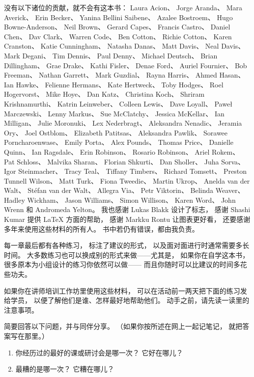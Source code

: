 没有以下诸位的贡献，就不会有这本书：
Laura Acion、
Jorge Aranda、
Mara Averick、
Erin Becker、
Yanina Bellini Saibene、
Azalee Bostroem、
Hugo Bowne-Anderson、
Neil Brown、
Gerard Capes、
Francis Castro、
Daniel Chen、
Dav Clark、
Warren Code、
Ben Cotton、
Richie Cotton、
Karen Cranston、
Katie Cunningham、
Natasha Danas、
Matt Davis、
Neal Davis、
Mark Degani、
Tim Dennis、
Paul Denny、
Michael Deutsch、
Brian Dillingham、
Grae Drake、
Kathi Fisler、
Denae Ford、
Auriel Fournier、
Bob Freeman、
Nathan Garrett、
Mark Guzdial、
Rayna Harris、
Ahmed Hasan、
Ian Hawke、
Felienne Hermans、
Kate Hertweck、
Toby Hodges、
Roel Hogervorst、
Mike Hoye、
Dan Katz、
Christina Koch、
Shriram Krishnamurthi、
Katrin Leinweber、
Colleen Lewis、
Dave Loyall、
Paweł Marczewski、
Lenny Markus、
Sue McClatchy、
Jessica McKellar、
Ian Milligan、
Julie Moronuki、
Lex Nederbragt、
Aleksandra Nenadic、
Jeramia Ory、
Joel Ostblom、
Elizabeth Patitsas、
Aleksandra Pawlik、
Sorawee Porncharoenwase、
Emily Porta、
Alex Pounds、
Thomas Price、
Danielle Quinn、
Ian Ragsdale、
Erin Robinson、
Rosario Robinson、
Ariel Rokem、
Pat Schloss、
Malvika Sharan、
Florian Shkurti、
Dan Sholler、
Juha Sorva、
Igor Steinmacher、
Tracy Teal、
Tiffany Timbers、
Richard Tomsett、
Preston Tunnell Wilson、
Matt Turk、
Fiona Tweedie、
Martin Ukrop、
Anelda van der Walt、
Stéfan van der Walt、
Allegra Via、
Petr Viktorin、
Belinda Weaver、
Hadley Wickham、
Jason Williams、
Simon Willison、
Karen Word、
John Wrenn 和 Andromeda Yelton。
我也感谢 Lukas Blakk 设计了标志，
感谢 Shashi Kumar 提供 LaTeX 方面的帮助，
感谢 Markku Rontu 让图表更好看，
还要感谢多年来使用这些材料的所有人。
书中若仍有错误，都由我负责。


每一章最后都有各种练习，
标注了建议的形式，
以及面对面进行时通常需要多长时间。
大多数练习也可以换成别的形式来做——尤其是，
如果你在自学这本书，
很多原本为小组设计的练习你依然可以做——
而且你随时可以比建议的时间多花些功夫。

如果你在讲师培训工作坊里使用这些材料，
可以在活动前一两天把下面的练习发给学员，
以便了解他们是谁、怎样最好地帮助他们。
动手之前，请先读一读里的注意事项。


简要回答以下问题，并与同伴分享。
（如果你按所述在网上一起记笔记，
就把答案写在那里。）

\begin{enumerate}

\item
  你经历过的最好的课或研讨会是哪一次？
  它好在哪儿？

\item
  最糟的是哪一次？
  它糟在哪儿？

\end{enumerate}

